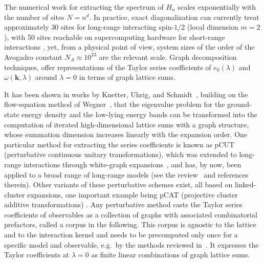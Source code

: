 \documentclass[]{amsart}
\numberwithin{mythm}{section}
\begin{document}
The numerical work for extracting the spectrum of $H_n$ scales exponentially with the number of sites $N=n^d$. In practice, exact diagonalization can currently treat approximately 30 sites for long-range interacting spin-$1/2$ (local dimension $m=2$), with 50 sites reachable on supercomputing hardware for short-range interactions \cite{Wietek2018}, yet, from a physical point of view, system sizes of the order of the Avogadro constant $N_A\approx 10^{23}$ are the relevant scale. 
Graph decomposition techniques, offer representations of
the Taylor series coefficients of $e_0(\lambda)$ and $\omega(\bm k,\lambda)$ around $\lambda = 0$ in terms of graph lattice sums.


It has been shown in works by Knetter, Uhrig, and Schmidt~\cite{Knetter2000,Knetter2003}, building on the flow-equation method of Wegner~\cite{Wegner1994}, that the eigenvalue problem for the ground-state energy density and the low-lying energy bands can be transformed into the computation of iterated high-dimensional lattice sums with a graph structure, whose summation dimension increases linearly with the expansion order. One particular method for extracting the series coefficients is known as pCUT (perturbative continuous unitary transformations), which was extended to long-range interactions through white-graph expansions~\cite{Coester2015,Fey2016,fey2019quantum}, and has, by now, been applied to a broad range of long-range models (see the review~\cite{adelhardt2024monte} and references therein). Other variants of these perturbative schemes exist, all based on linked-cluster expansions, one important example being pCAT (projective cluster additive transformations) \cite{hormann2023projective}. Any perturbative method casts the Taylor series coefficients of observables as a collection of graphs with associated combinatorial prefactors, called a corpus in the following. This corpus is agnostic to the lattice and to the interaction kernel and needs to be precomputed only once for a specific model and observable, e.g.\ by the methods reviewed in~\cite{adelhardt2024monte}. It expresses the Taylor coefficients at $\lambda=0$ as finite linear combinations of graph lattice sums. 
\end{document}
